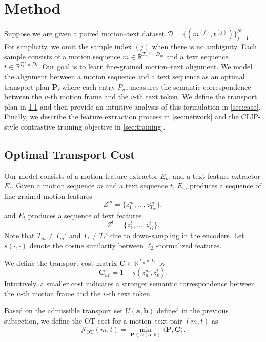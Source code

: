 
\section{Method}
Suppose we are given a paired motion--text dataset $\mathcal{D}=\{(m^{(j)}, t^{(j)})\}_{j=1}^{N}$.
For simplicity, we omit the sample index $(j)$ when there is no ambiguity.
Each sample consists of a motion sequence $m \in \mathbb{R}^{T_m' \times D_m}$ and a text sequence $t \in \mathbb{R}^{T_t' \times D_t}$. Our goal is to learn fine-grained motion--text alignment.
We model the alignment between a motion sequence and a text sequence as an optimal transport plan
$\mathbf{P}$,
where each entry $P_{uv}$ measures the semantic correspondence between the $u$-th motion frame and the $v$-th text token. We define the transport plan in \cref{sec:ot} and then provide an intuitive analysis of this formulation in \cref{sec:case}. Finally, we describe the feature extraction process in \cref{sec:network} and the CLIP-style contrastive training objective in \cref{sec:training}.

\subsection{Optimal Transport Cost}
\label{sec:ot}
Our model consists of a motion feature extractor $E_m$ and a text feature extractor $E_t$.
Given a motion sequence $m$ and a text sequence $t$, $E_m$ produces a sequence of fine-grained motion features
\begin{equation}
Z^m=\{z^m_1,\ldots,z^m_{T_m}\},
\end{equation}
and $E_t$ produces a sequence of text features
\begin{equation}
Z^t=\{z^t_1,\ldots,z^t_{T_t}\}.
\end{equation}
Note that $T_m\neq T_m'$ and $T_t\neq T_t'$ due to down-sampling in the encoders. Let $s(\cdot,\cdot)$ denote the cosine similarity between $\ell_2$-normalized features.

We define the transport cost matrix $\mathbf{C}\in\mathbb{R}^{T_m\times T_t}$ by
\begin{equation}
\label{eq:cost_matrix}
\mathbf{C}_{uv}=1-s(z^m_u,z^t_v).
\end{equation}
Intuitively, a smaller cost indicates a stronger semantic correspondence between the $u$-th motion frame and the $v$-th text token.

Based on the admissible transport set $U(\mathbf{a},\mathbf{b})$ defined in the previous subsection, we define the OT cost for a motion--text pair $(m,t)$ as
\begin{equation}
\label{eq:ot_single}
\mathcal{J}_{\mathrm{OT}}(m,t)
=
\min_{\mathbf{P}\in U(\mathbf{a},\mathbf{b})}
\langle \mathbf{P},\mathbf{C}\rangle.
\end{equation}

